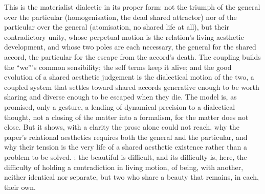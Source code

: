 This is the materialist dialectic in its proper form: not the triumph of the general over the particular (homogenisation, the dead shared attractor) nor of the particular over the general (atomisation, no shared life at all), but their contradictory unity, whose perpetual motion is the relation's living aesthetic development, and whose two poles are each necessary, the general for the shared accord, the particular for the escape from the accord's death. The coupling builds the ``we'''s common sensibility; the self terms keep it alive; and the good evolution of a shared aesthetic judgement is the dialectical motion of the two, a coupled system that settles toward shared accords generative enough to be worth sharing and diverse enough to be escaped when they die. The model is, as promised, only a gesture, a lending of dynamical precision to a dialectical thought, not a closing of the matter into a formalism, for the matter does not close. But it shows, with a clarity the prose alone could not reach, why the paper's relational aesthetics requires both the general and the particular, and why their tension is the very life of a shared aesthetic existence rather than a problem to be solved. : the beautiful is difficult, and its difficulty is, here, the difficulty of holding a contradiction in living motion, of being, with another, neither identical nor separate, but two who share a beauty that remains, in each, their own.
